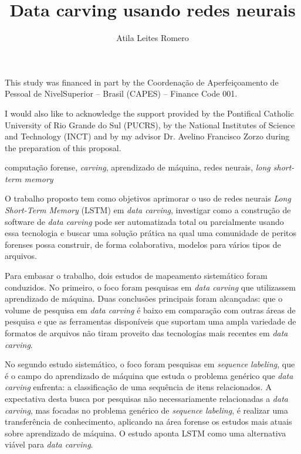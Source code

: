 \documentclass[english,oneside]{pucrs-ppgcc}
\author{Atila Leites Romero}
\title{Data carving usando redes neurais}
      {Data carving using neural networks}
\begin{document}
%


\begin{agradecimentos}
This study was financed in part by the Coordenação de Aperfeiçoamento de Pessoal de NivelSuperior – Brasil (CAPES) – Finance Code 001.

I would also like to acknowledge the support provided by the Pontifical Catholic University of Rio Grande do Sul (PUCRS), by the National Institutes of Science and Technology (INCT) and by my advisor Dr. Avelino Francisco Zorzo during the preparation of this proposal.

\end{agradecimentos}

\begin{resumo}{computação forense, \textit{carving}, aprendizado de máquina, redes neurais, \textit{long short-term memory}}

O trabalho proposto tem como objetivos aprimorar o uso de redes neurais \textit{Long Short-Term Memory} (LSTM) em \textit{data carving}, investigar como a construção de software de \textit{data carving} pode ser automatizada total ou parcialmente usando essa tecnologia e buscar uma solução prática na qual uma comunidade de peritos forenses possa construir, de forma colaborativa, modelos para vários tipos de arquivos.


Para embasar o  trabalho, dois estudos de mapeamento sistemático foram conduzidos.
No primeiro, o foco foram pesquisas em \textit{data carving} que utilizassem aprendizado de máquina. Duas conclusões principais foram alcançadas: que o volume de pesquisa em \textit{data carving} é baixo em comparação com outras áreas de pesquisa e que as ferramentas disponíveis que suportam uma ampla variedade de formatos de arquivos não tiram proveito das tecnologias mais recentes em \textit{data carving}.

No segundo estudo sistemático, o foco foram pesquisas em \textit{sequence labeling}, que é o campo do aprendizado de máquina que estuda o problema genérico que \textit{data carving} enfrenta: a classificação de uma sequência de itens relacionados. A expectativa desta busca por pesquisas não necessariamente relacionadas a \textit{data carving}, mas focadas no problema genérico de \textit{sequence labeling}, é realizar uma transferência de conhecimento, aplicando na área forense os estudos mais atuais sobre aprendizado de máquina. O estudo aponta LSTM como uma alternativa viável para \textit{data carving}.

\end{resumo}
\end{document}

